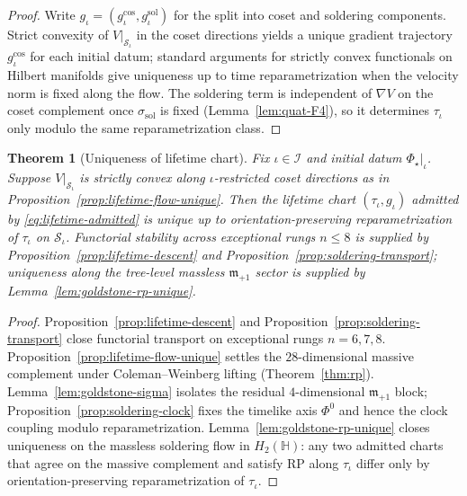 \documentclass[aps,prd,onecolumn,amsmath,amssymb,nofootinbib,11pt]{revtex4-2}
\numberwithin{equation}{section}
\theoremstyle{plain}
\newtheorem{theorem}{Theorem}[section]
\theoremstyle{definition}
\theoremstyle{remark}
\newcommand{\Quat}{\mathbb{H}}
\newcommand{\orderparam}{\Phi}
\begin{document}
\begin{proof}
Write $g_\iota=(g_\iota^{\mathrm{cos}},g_\iota^{\mathrm{sol}})$ for the
split into coset and soldering components. Strict convexity of
$V|_{\mathcal{S}_\iota}$ in the coset directions yields a unique gradient
trajectory $g_\iota^{\mathrm{cos}}$ for each initial datum; standard
arguments for strictly convex functionals on Hilbert manifolds give uniqueness
up to time reparametrization when the velocity norm is fixed along the flow.
The soldering term is independent of $\nabla V$ on the coset complement once
$\sigma_{\mathrm{sol}}$ is fixed (Lemma~\ref{lem:quat-F4}), so it determines
$\tau_\iota$ only modulo the same reparametrization class.
\end{proof}

\begin{theorem}[Uniqueness of lifetime chart]\label{thm:lifetime-unique}
Fix $\iota\in\mathcal{I}$ and initial datum
$\orderparam_\star|_\iota$. Suppose $V|_{\mathcal{S}_\iota}$ is strictly
convex along $\iota$-restricted coset directions as in
Proposition~\ref{prop:lifetime-flow-unique}. Then the lifetime chart
$(\tau_\iota,g_\iota)$ admitted by \eqref{eq:lifetime-admitted} is unique up
to orientation-preserving reparametrization of $\tau_\iota$ on
$\mathcal{S}_\iota$. Functorial stability across exceptional rungs
$n\leq8$ is supplied by Proposition~\ref{prop:lifetime-descent} and
Proposition~\ref{prop:soldering-transport}; uniqueness along the tree-level
massless $\mathfrak{m}_{+1}$ sector is supplied by
Lemma~\ref{lem:goldstone-rp-unique}.
\end{theorem}

\begin{proof}
Proposition~\ref{prop:lifetime-descent} and
Proposition~\ref{prop:soldering-transport} close functorial transport on
exceptional rungs $n=6,7,8$. Proposition~\ref{prop:lifetime-flow-unique}
settles the $28$-dimensional massive complement under Coleman--Weinberg lifting
(Theorem~\ref{thm:rp}). Lemma~\ref{lem:goldstone-sigma} isolates the residual
$4$-dimensional $\mathfrak{m}_{+1}$ block; Proposition~\ref{prop:soldering-clock}
fixes the timelike axis $\orderparam^0$ and hence the clock coupling modulo
reparametrization. Lemma~\ref{lem:goldstone-rp-unique} closes uniqueness on
the massless soldering flow in $H_2(\Quat)$: any two admitted charts that
agree on the massive complement and satisfy RP along $\tau_\iota$ differ only
by orientation-preserving reparametrization of $\tau_\iota$.
\end{proof}
\end{document}
